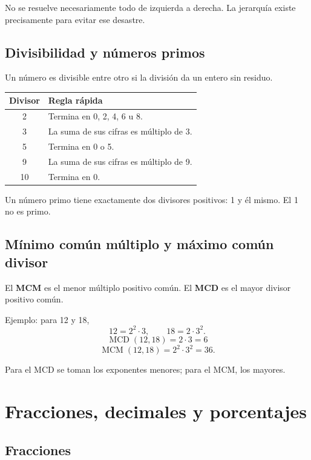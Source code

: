 \documentclass[10pt,oneside]{book}
\begin{document}
	\begin{ojo}
		No se resuelve necesariamente todo de izquierda a derecha.
		La jerarquía existe precisamente para evitar ese desastre.
	\end{ojo}
	
	\section{Divisibilidad y números primos}
	
	Un número es divisible entre otro si la división da un entero
	sin residuo.
	
	\begin{center}
		\begin{tabularx}{\textwidth}{cX}
			\toprule
			Divisor & Regla rápida\\
			\midrule
			2 & Termina en 0, 2, 4, 6 u 8.\\
			3 & La suma de sus cifras es múltiplo de 3.\\
			5 & Termina en 0 o 5.\\
			9 & La suma de sus cifras es múltiplo de 9.\\
			10 & Termina en 0.\\
			\bottomrule
		\end{tabularx}
	\end{center}
	
	Un número primo tiene exactamente dos divisores positivos:
	1 y él mismo. El 1 no es primo.
	
	\section{Mínimo común múltiplo y máximo común divisor}
	
	El \textbf{MCM} es el menor múltiplo positivo común.
	El \textbf{MCD} es el mayor divisor positivo común.
	
	Ejemplo: para 12 y 18,
	\[
	12=2^2\cdot3,\qquad 18=2\cdot3^2.
	\]
	\[
	\operatorname{MCD}(12,18)=2\cdot3=6
	\]
	\[
	\operatorname{MCM}(12,18)=2^2\cdot3^2=36.
	\]
	
	Para el MCD se toman los exponentes menores; para el MCM,
	los mayores.
	
	\chapter{Fracciones, decimales y porcentajes}
	
	\section{Fracciones}
	
\end{document}
